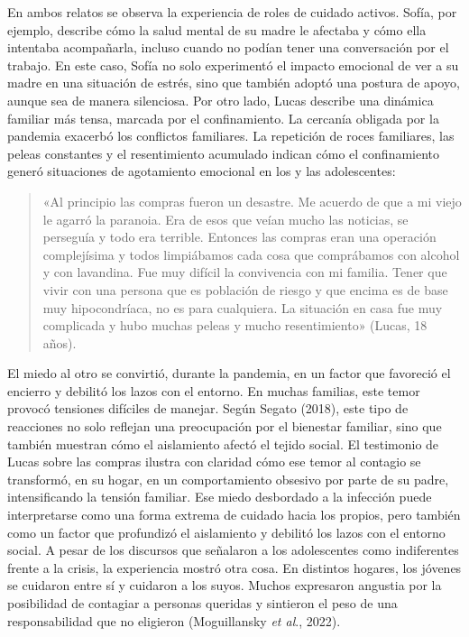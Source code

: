 En ambos relatos se observa la experiencia de roles de cuidado activos. Sofía, por ejemplo, describe cómo la salud mental de su madre le afectaba y cómo ella intentaba acompañarla, incluso cuando no podían tener una conversación por el trabajo. En este caso, Sofía no solo experimentó el impacto emocional de ver a su madre en una situación de estrés, sino que también adoptó una postura de apoyo, aunque sea de manera silenciosa. Por otro lado, Lucas describe una dinámica familiar más tensa, marcada por el confinamiento. La cercanía obligada por la pandemia exacerbó los conflictos familiares. La repetición de roces familiares, las peleas constantes y el resentimiento acumulado indican cómo el confinamiento generó situaciones de agotamiento emocional en los y las adolescentes:

\begin{quote}
«Al principio las compras fueron un desastre. Me acuerdo de que a mi viejo le agarró la paranoia. Era de esos que veían mucho las noticias, se perseguía y todo era terrible. Entonces las compras eran una operación complejísima y todos limpiábamos cada cosa que comprábamos con alcohol y con lavandina. Fue muy difícil la convivencia con mi familia. Tener que vivir con una persona que es población de riesgo y que encima es de base muy hipocondríaca, no es para cualquiera. La situación en casa fue muy complicada y hubo muchas peleas y mucho resentimiento» (Lucas, 18 años).
\end{quote}

El miedo al otro se convirtió, durante la pandemia, en un factor que favoreció el encierro y debilitó los lazos con el entorno. En muchas familias, este temor provocó tensiones difíciles de manejar. Según Segato (2018), este tipo de reacciones no solo reflejan una preocupación por el bienestar familiar, sino que también muestran cómo el aislamiento afectó el tejido social. El testimonio de Lucas sobre las compras ilustra con claridad cómo ese temor al contagio se transformó, en su hogar, en un comportamiento obsesivo por parte de su padre, intensificando la tensión familiar. Ese miedo desbordado a la infección puede interpretarse como una forma extrema de cuidado hacia los propios, pero también como un factor que profundizó el aislamiento y debilitó los lazos con el entorno social. A pesar de los discursos que señalaron a los adolescentes como indiferentes frente a la crisis, la experiencia mostró otra cosa. En distintos hogares, los jóvenes se cuidaron entre sí y cuidaron a los suyos. Muchos expresaron angustia por la posibilidad de contagiar a personas queridas y sintieron el peso de una responsabilidad que no eligieron (Moguillansky \emph{et al}., 2022).

